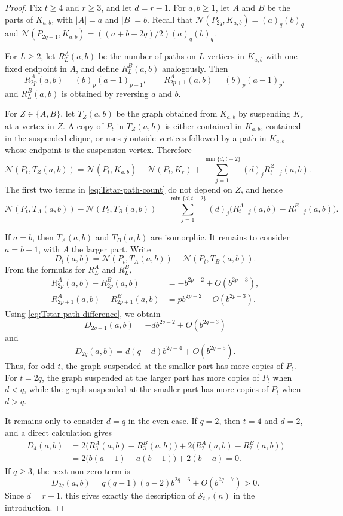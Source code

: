 \documentclass[11pt]{article}
\theoremstyle{definition}
\theoremstyle{plain}
\theoremstyle{remark}
\theoremstyle{plain}
\numberwithin{equation}{section}
\newcommand{\cS}{\mathcal S}
\newcommand{\N}{\mathcal N}
\begin{document}
\begin{proof}
Fix $t\ge4$ and $r\ge3$, and let $d=r-1$. For $a,b\ge1$, let $A$ and $B$ be the parts of $K_{a,b}$, with $|A|=a$ and $|B|=b$. Recall that $\N(P_{2q},K_{a,b})=(a)_q(b)_q$ and $\N(P_{2q+1},K_{a,b})=((a+b-2q)/2)(a)_q(b)_q$.

For $L\ge2$, let $R_L^A(a,b)$ be the number of paths on $L$ vertices in $K_{a,b}$ with one fixed endpoint in $A$, and define $R_L^B(a,b)$ analogously. Then
\[
        R_{2p}^A(a,b)=(b)_p(a-1)_{p-1},
        \qquad
        R_{2p+1}^A(a,b)=(b)_p(a-1)_p,
\]
and $R_L^B(a,b)$ is obtained by reversing $a$ and $b$.

For $Z\in\{A,B\}$, let $T_Z(a,b)$ be the graph obtained from $K_{a,b}$ by suspending $K_r$ at a vertex in $Z$. A copy of $P_t$ in $T_Z(a,b)$ is either contained in $K_{a,b}$, contained in the suspended clique, or uses $j$ outside vertices followed by a path in $K_{a,b}$ whose endpoint is the suspension vertex. Therefore
\begin{equation}\label{eq:Tstar-path-count}
        \N(P_t,T_Z(a,b))
        =\N(P_t,K_{a,b})+\N(P_t,K_r)
        +\sum_{j=1}^{\min\{d,t-2\}}(d)_jR^Z_{t-j}(a,b).
\end{equation}
The first two terms in \eqref{eq:Tstar-path-count} do not depend on $Z$, and hence
\begin{equation}\label{eq:Tstar-path-difference}
        \N(P_t,T_A(a,b))-\N(P_t,T_B(a,b))
        =\sum_{j=1}^{\min\{d,t-2\}}(d)_j
        \bigl(R^A_{t-j}(a,b)-R^B_{t-j}(a,b)\bigr).
\end{equation}

If $a=b$, then $T_A(a,b)$ and $T_B(a,b)$ are isomorphic. It remains to consider $a=b+1$, with $A$ the larger part. Write
\[
        D_t(a,b)=\N(P_t,T_A(a,b))-\N(P_t,T_B(a,b)).
\]
From the formulas for $R_L^A$ and $R_L^B$,
\[
\begin{aligned}
        R_{2p}^A(a,b)-R_{2p}^B(a,b)
        &=-b^{2p-2}+O(b^{2p-3}),\\
        R_{2p+1}^A(a,b)-R_{2p+1}^B(a,b)
        &=p b^{2p-2}+O(b^{2p-3}).
\end{aligned}
\]
Using \eqref{eq:Tstar-path-difference}, we obtain
\[
        D_{2q+1}(a,b)=-d b^{2q-2}+O(b^{2q-3})
\]
and
\[
        D_{2q}(a,b)=d(q-d)b^{2q-4}+O(b^{2q-5}).
\]
Thus, for odd $t$, the graph suspended at the smaller part has more copies of $P_t$. For $t=2q$, the graph suspended at the larger part has more copies of $P_t$ when $d<q$, while the graph suspended at the smaller part has more copies of $P_t$ when $d>q$.

It remains only to consider $d=q$ in the even case. If $q=2$, then $t=4$ and $d=2$, and a direct calculation gives
\[
\begin{aligned}
        D_4(a,b)
        &=2\bigl(R_3^A(a,b)-R_3^B(a,b)\bigr)
          +2\bigl(R_2^A(a,b)-R_2^B(a,b)\bigr)\\
        &=2\bigl(b(a-1)-a(b-1)\bigr)+2(b-a)=0.
\end{aligned}
\]
If $q\ge3$, the next non-zero term is
\[
        D_{2q}(a,b)=q(q-1)(q-2)b^{2q-6}+O(b^{2q-7})>0.
\]
Since $d=r-1$, this gives exactly the description of $\cS_{t,r}(n)$ in the introduction.
\end{proof}
\end{document}

